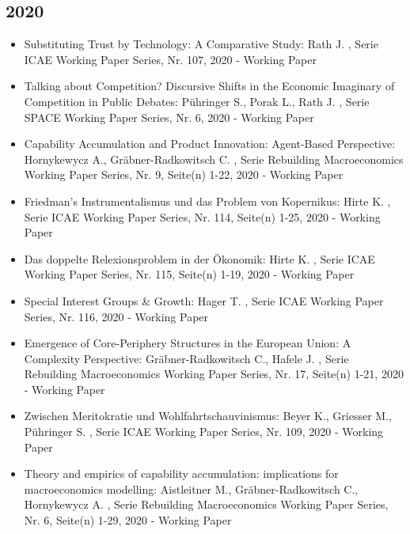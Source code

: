  \subsection{2020} 
 \begin{itemize} 
	 \item Substituting Trust by Technology: A Comparative Study: Rath J. , Serie ICAE Working Paper Series, Nr. 107, 2020 - Working Paper
	 \item Talking about Competition? Discursive Shifts in the Economic Imaginary of Competition in Public Debates: Pühringer S., Porak L., Rath J. , Serie SPACE Working Paper Series, Nr. 6, 2020 - Working Paper
	 \item Capability Accumulation and Product Innovation: Agent-Based Perspective: Hornykewycz A., Gräbner-Radkowitsch C. , Serie Rebuilding Macroeconomics Working Paper Series, Nr. 9, Seite(n) 1-22, 2020 - Working Paper
	 \item Friedman’s Instrumentalismus und das Problem von Kopernikus: Hirte K. , Serie ICAE Working Paper Series, Nr. 114, Seite(n) 1-25, 2020 - Working Paper
	 \item Das doppelte Relexionsproblem in der Ökonomik: Hirte K. , Serie ICAE Working Paper Series, Nr. 115, Seite(n) 1-19, 2020 - Working Paper
	 \item Special Interest Groups & Growth: Hager T. , Serie ICAE Working Paper Series, Nr. 116, 2020 - Working Paper
	 \item Emergence of Core-Periphery Structures in the European Union: A Complexity Perspective: Gräbner-Radkowitsch C., Hafele J. , Serie Rebuilding Macroeconomics Working Paper Series, Nr. 17, Seite(n) 1-21, 2020 - Working Paper
	 \item Zwischen Meritokratie und Wohlfahrtschauvinismus: Beyer K., Griesser M., Pühringer S. , Serie ICAE Working Paper Series, Nr. 109, 2020 - Working Paper
	 \item Theory and empirics of capability accumulation: implications for macroeconomics modelling: Aistleitner M., Gräbner-Radkowitsch C., Hornykewycz A. , Serie Rebuilding Macroeconomics Working Paper Series, Nr. 6, Seite(n) 1-29, 2020 - Working Paper
\end{itemize} 
